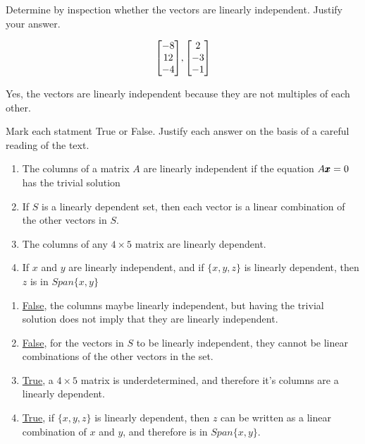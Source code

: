 \documentclass{../mathhomework}
\newcommand{\Span}[1]{\textit{Span}\{#1\}}
\newenvironment{Mat}{\begin{bmatrix}}{\end{bmatrix}}
\begin{document}
\begin{problem}[1.7\#19]
    Determine by inspection whether the vectors are linearly independent. Justify your answer.

    \begin{equation*}
        \begin{Mat}
            -8 \\ 12 \\ -4
        \end{Mat},
        \begin{Mat}
            2 \\ -3 \\ -1
        \end{Mat}
    \end{equation*}

    \begin{solution}
        Yes, the vectors are linearly independent because they are not multiples of each other.
    \end{solution}
\end{problem}

\begin{problem}[1.7\#21]
    Mark each statment True or False. Justify each answer on the basis of a careful reading of the text.
    
    \begin{enumerate}[label=(\alph*)]
        \item The columns of a matrix $A$ are linearly independent if the equation $A\pmb{x} = 0$ has the trivial solution
        \item If $S$ is a linearly dependent set, then each vector is a linear combination of the other vectors in $S$.
        \item The columns of any $4 \times 5$ matrix are linearly dependent.
        \item If $x$ and $y$ are linearly independent, and if $\{x,y,z\}$ is linearly dependent, then $z$ is in $\Span{x,y}$
    \end{enumerate}

    \begin{solution}
        \begin{enumerate}[label=(\alph*)]
            \item \underline{False}, the columns maybe linearly independent, but having the trivial solution does not imply that they are linearly independent.
            \item \underline{False}, for the vectors in $S$ to be linearly independent, they cannot be linear combinations of the other vectors in the set.
            \item \underline{True}, a $4 \times 5$ matrix is underdetermined, and therefore it's columns are a linearly dependent.
            \item \underline{True}, if $\{x,y,z\}$ is linearly dependent, then $z$ can be written as a linear combination of $x$ and $y$, and therefore is in $\Span{x,y}$.
        \end{enumerate}
    \end{solution}
\end{problem}
\end{document}
